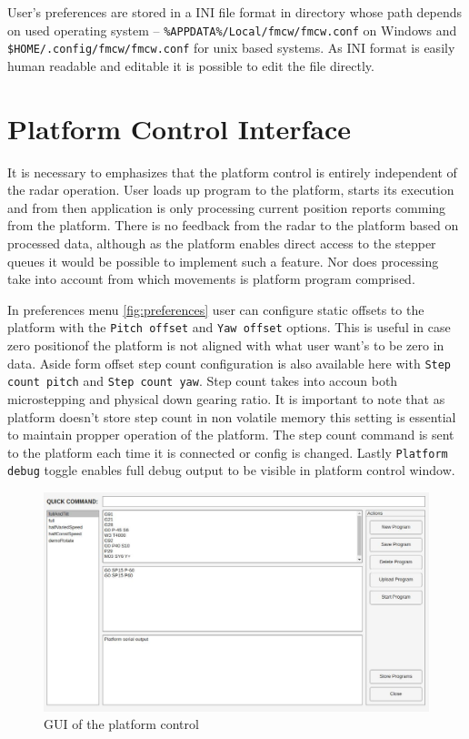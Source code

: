 User's preferences are stored in a INI file format in directory whose path depends on used operating system -- \texttt{\%APPDATA\%/Local/fmcw/fmcw.conf} on Windows and \texttt{\$HOME/.config/fmcw/fmcw.conf} for unix based systems.
As INI format is easily human readable and editable it is possible to edit the file directly.


\section{Platform Control Interface}

It is necessary to emphasizes that the platform control is entirely independent of the radar operation.
User loads up program to the platform, starts its execution and from then application is only processing current position reports comming from the platform.
There is no feedback from the radar to the platform based on processed data, although as the platform enables direct access to the stepper queues it would be possible to implement such a feature.
Nor does processing take into account from which movements is platform program comprised.

In preferences menu \ref{fig:preferences} user can configure static offsets to the platform with the \texttt{Pitch offset} and \texttt{Yaw offset} options.
This is useful in case zero positionof the platform is not aligned with what user want's to be zero in data.
Aside form offset step count configuration is also available here with \texttt{Step count pitch} and \texttt{Step count yaw}.
Step count takes into accoun both microstepping and physical down gearing ratio.
It is important to note that as platform doesn't store step count in non volatile memory this setting is essential to maintain propper operation of the platform.
The step count command is sent to the platform each time it is connected or config is changed.
Lastly \texttt{Platform debug} toggle enables full debug output to be visible in platform control window.

\begin{figure}[h!]
  \centering
  \includegraphics[width=\textwidth]{../img/platform_control.jpg}
  \caption[GUI of the platform control]{GUI of the platform control}
  \label{fig:platformControl}
\end{figure}

